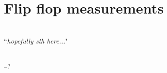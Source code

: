 
\chapter{Flip flop measurements} %

\label{Chapter7} %

\HRule
\vspace{0.5cm} \hspace{2cm}
\small
\hangindent=4cm
\\
        ``\emph{hopefully sth here...}"
\\ \\
\hangindent=4cm
\begin{flushright}
--? \\
\end{flushright}

\vspace{0.5cm}

\noindent \HRule
\clearpage



